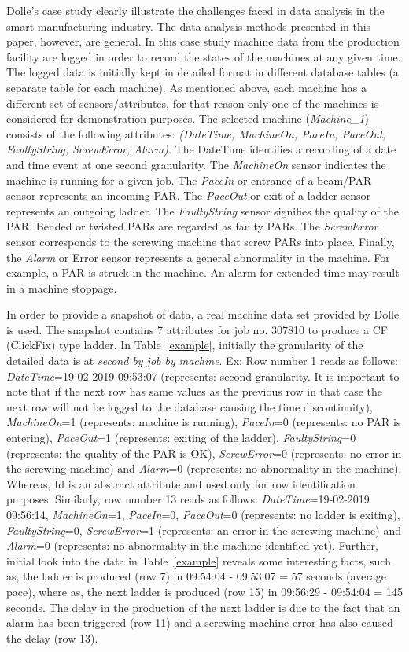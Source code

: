 \documentclass[runningheads]{llncs}
\begin{document}
Dolle's case study clearly illustrate the challenges faced in data analysis in the smart manufacturing industry. The data analysis methods presented in this paper, however, are general. In this case study machine data from the production facility are logged in order to record the states of the machines at any given time. The logged data is initially kept in detailed format in different database tables (a separate table for each machine). As mentioned above, each machine has a different set of sensors/attributes, for that reason only one of the machines is considered for demonstration purposes. The selected machine (\emph{Machine\_1}) consists of the following attributes: \emph{(DateTime, MachineOn, PaceIn, PaceOut, FaultyString, ScrewError, Alarm)}. The DateTime identifies a recording of a date and time event at one second granularity. The \emph{MachineOn} sensor indicates the machine is running for a given job. The \emph{PaceIn} or entrance of a beam/PAR sensor represents an incoming PAR. The \emph{PaceOut} or exit of a ladder sensor represents an outgoing ladder. The \emph{FaultyString} sensor signifies the quality of the PAR. Bended or twisted PARs are regarded as faulty PARs. The \emph{ScrewError} sensor corresponds to the screwing machine that screw PARs into place. Finally, the \emph{Alarm} or Error sensor represents a general abnormality in the machine. For example, a PAR is struck in the machine. An alarm for extended time may result in a  machine stoppage.

In order to provide a snapshot of data, a real machine data set provided by Dolle is used. The snapshot contains 7 attributes for job no. 307810 to produce a CF (ClickFix) type ladder. In Table~\ref{example}, initially the granularity of the detailed data is at \emph{second by job by machine}. Ex: Row number 1 reads as follows: \emph{DateTime}=19-02-2019 09:53:07 (represents: second granularity. It is important to note that if the next row has same values as the previous row in that case the next row will not be logged to the database causing the time discontinuity), \emph{MachineOn}=1 (represents: machine is running), \emph{PaceIn}=0 (represents: no PAR is entering), \emph{PaceOut}=1 (represents: exiting of the ladder), \emph{FaultyString}=0 (represents: the quality of the PAR is OK), \emph{ScrewError}=0 (represents: no error in the screwing machine) and \emph{Alarm}=0 (represents: no abnormality in the machine). Whereas, Id is an abstract attribute and used only for row identification purposes. Similarly, row number 13 reads as follows: \emph{DateTime}=19-02-2019 09:56:14, \emph{MachineOn}=1, \emph{PaceIn}=0, \emph{PaceOut}=0 (represents: no ladder is exiting), \emph{FaultyString}=0, \emph{ScrewError}=1 (represents: an error in the screwing machine) and \emph{Alarm}=0 (represents: no abnormality in the machine identified yet). Further, initial look into the data in Table~\ref{example} reveals some interesting facts, such as, the ladder is produced (row 7) in 09:54:04 - 09:53:07 = 57 seconds (average pace), where as, the next ladder is produced (row 15) in 09:56:29 - 09:54:04 = 145 seconds. The delay in the production of the next ladder is due to the fact that an alarm has been triggered (row 11) and a screwing machine error has also caused the delay (row 13). 
\end{document}
